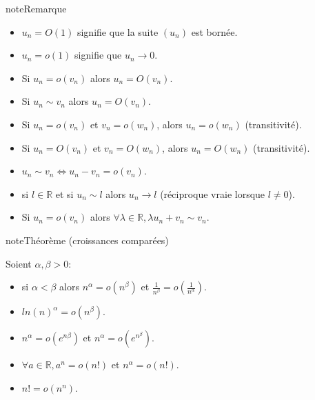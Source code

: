 \documentclass[letterpaper,10pt,french]{jupyterBook}
\begin{document}
\begin{sphinxadmonition}{note}{Remarque}
\begin{itemize}
\item {} 
\sphinxAtStartPar
\(u_n = O(1)\) signifie que la suite \((u_n)\) est bornée.

\item {} 
\sphinxAtStartPar
\(u_n = o(1)\) signifie que \(u_n\to 0\).

\item {} 
\sphinxAtStartPar
Si \(u_n = o(v_n)\) alors \(u_n = O(v_n)\).

\item {} 
\sphinxAtStartPar
Si \(u_n \sim v_n\) alors \(u_n = O(v_n)\).

\item {} 
\sphinxAtStartPar
Si \(u_n = o(v_n)\) et \(v_n = o(w_n)\), alors \(u_n = o(w_n)\) (transitivité).

\item {} 
\sphinxAtStartPar
Si \(u_n = O(v_n)\) et \(v_n = O(w_n)\), alors \(u_n = O(w_n)\) (transitivité).

\item {} 
\sphinxAtStartPar
\(u_n \sim v_n \Leftrightarrow u_n − v_n = o(v_n)\).

\item {} 
\sphinxAtStartPar
si \(l \in \mathbb{R}\) et si \(u_n \sim l\) alors \(u_n \to l\) (réciproque vraie lorsque \(l \neq 0\)).

\item {} 
\sphinxAtStartPar
Si \(u_n = o(v_n)\) alors \(\forall \lambda \in \mathbb{R}, \lambda u_n + v_n \sim v_n\).

\end{itemize}
\end{sphinxadmonition}

\begin{sphinxadmonition}{note}{Théorème (croissances comparées)}

\sphinxAtStartPar
Soient \(\alpha, \beta > 0\):
\begin{itemize}
\item {} 
\sphinxAtStartPar
si \(\alpha < \beta\) alors \(n^\alpha = o(n^\beta)\) et \( \frac{1}{n^\beta} = o(\frac{1}{n^\alpha})\).

\item {} 
\sphinxAtStartPar
\(ln(n)^\alpha = o(n^\beta)\).

\item {} 
\sphinxAtStartPar
\(n^\alpha =o(e^{n\beta})\) et \(n^\alpha =o(e^{n^\beta})\).

\item {} 
\sphinxAtStartPar
\(\forall a \in \mathbb{R}, a^n =o(n!)\) et \(n^\alpha = o(n!)\).

\item {} 
\sphinxAtStartPar
\(n! = o(n^n)\).

\end{itemize}
\end{sphinxadmonition}
\end{document}
